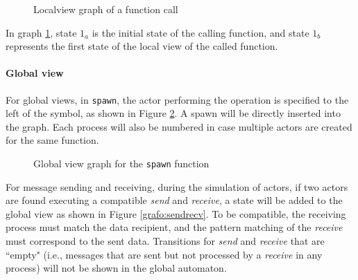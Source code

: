 \begin{figure}[!ht]
    \centering
    \caption{Localview graph of a function call}
    \label{grafo:funcall}
\end{figure}

In graph \ref{grafo:funcall}, state $1_a$ is the initial state of the calling function,  
and state $1_b$ represents the first state of the local view of the called function.

\paragraph{Global view}
For global views, in \texttt{spawn}, the actor performing the operation is specified to  
the left of the symbol, as shown in Figure \ref{grafo:globspawn}. A spawn will be  
directly inserted into the graph. Each process will also be numbered in case multiple  
actors are created for the same function.

\begin{figure}[!ht]
    \centering
    \caption{Global view graph for the \texttt{spawn} function}
    \label{grafo:globspawn}
\end{figure}

For message sending and receiving, during the simulation of actors, if two actors are  
found executing a compatible \textit{send} and \textit{receive}, a state will be added  
to the global view as shown in Figure \ref{grafo:sendrecv}. To be compatible, the  
receiving process must match the data recipient, and the pattern matching of the  
\textit{receive} must correspond to the sent data. Transitions for \textit{send} and  
\textit{receive} that are ``empty" (i.e., messages that are sent but not processed by a  
\textit{receive} in any process) will not be shown in the global automaton.

